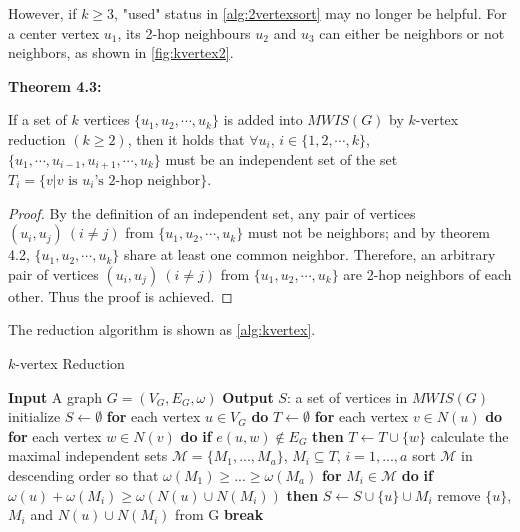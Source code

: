 \documentclass[sigconf, nonacm]{acmart}
\begin{document}
However, if $k\geq 3$, "used" status in \autoref{alg:2vertexsort} may no longer be helpful. For a center vertex $u_1$, its 2-hop neighbours $u_2$ and $u_3$ can either be neighbors or not neighbors, as shown in \autoref{fig:kvertex2}.

\begin{framed}
\noindent\textbf{Theorem 4.3:}

If a set of $k$ vertices $\{u_1, u_2, \cdots, u_k\}$ is added into $MWIS(G)$ by $k$-vertex reduction $(k\geq 2)$, then it holds that $\forall u_i$, $i\in\{1,2,\cdots,k\}$, $\{u_1, \cdots, u_{i-1}, u_{i+1}, \cdots, u_k\}$ must be an independent set of the set $T_i=\{v | v \text{ is }u_i\text{'s 2-hop neighbor}\}$.
\end{framed}

\begin{proof}
By the definition of an independent set, any pair of vertices $(u_i, u_j)\ (i\neq j)$ from $\{u_1, u_2, \cdots, u_k\}$ must not be neighbors; and by theorem 4.2, $\{u_1, u_2, \cdots, u_k\}$ share at least one common neighbor. Therefore, an arbitrary pair of vertices $(u_i, u_j)\ (i\neq j)$ from $\{u_1, u_2, \cdots, u_k\}$ are 2-hop neighbors of each other. Thus the proof is achieved.
\end{proof}

The reduction algorithm is shown as \autoref{alg:kvertex}.

\begin{algorithm}[tbp]
\caption{$k$-vertex Reduction}
\label{alg:kvertex}
\begin{algorithmic}
	\STATE   \textbf{Input} A graph $G=(V_G,E_G,\omega)$
	\STATE   \textbf{Output} $S$: a set of vertices in $MWIS(G)$
	\STATE   initialize $S\leftarrow \emptyset$
	\STATE   \textbf{for} each vertex $u\in V_G$ \textbf{do}
	\STATE   \quad $T \leftarrow \emptyset$
	\STATE   \quad \textbf{for} each vertex $v\in N(u)$ \textbf{do}
	\STATE   \quad \quad \textbf{for} each vertex $w\in N(v)$ \textbf{do}
	\STATE   \quad \quad \quad \textbf{if} $e(u,w) \notin E_G$ \textbf{then}
	\STATE   \quad \quad \quad \quad $T \leftarrow T \cup \{w\}$
	\STATE   \quad calculate the maximal independent sets $\mathcal{M}=\{M_1,...,M_a\}$, $M_i \subseteq T$, $i=1,...,a$
	\STATE   \quad sort $\mathcal{M}$ in descending order so that $\omega(M_1)\geq...\geq\omega(M_a)$
	\STATE   \quad \textbf{for} $M_i\in\mathcal{M}$ \textbf{do}
	\STATE   \quad \quad \textbf{if} $\omega(u)+\omega(M_i)\geq \omega(N(u)\cup N(M_i))$ \textbf{then}
	\STATE   \quad \quad \quad $S\leftarrow S\cup\{u\}\cup M_i$
	\STATE   \quad \quad \quad remove $\{u\}$, $M_i$ and $N(u)\cup N(M_i)$ from G
	\STATE   \quad \quad \quad \textbf{break}
\end{algorithmic}
\end{algorithm}
\end{document}
